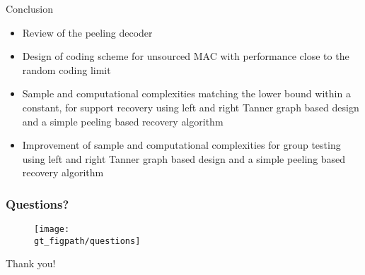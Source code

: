 \documentclass[10pt,usenames,dvipsnames]{beamer}
\def\gt_figpath{../Figures/GT}
\begin{document}





\begin{frame}{Conclusion}
\begin{itemize}
  \item Review of the peeling decoder
  \item Design of coding scheme for unsourced MAC with performance close to the random coding limit
  \item Sample and computational complexities matching the lower bound within a constant, for support recovery using left and right Tanner graph based design and a simple peeling based recovery algorithm
    \item Improvement of sample and computational complexities for group testing using left and right Tanner graph based design and a simple peeling based recovery algorithm
\end{itemize}
\end{frame}
	
\begin{frame}\frametitle{Questions?}
	\begin{figure}[t]
		\centering
		\texttt{[image: \\gt\_figpath/questions]}
	\end{figure}
	\centering
	\color{blue}
	\Huge{Thank you!}
\end{frame}
\end{document}
